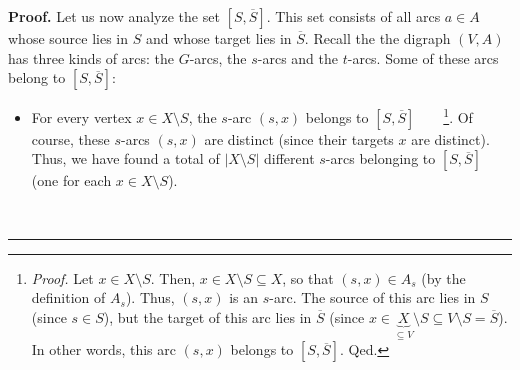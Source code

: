 \documentclass[numbers=enddot,12pt,final,onecolumn,notitlepage]{scrartcl}%
\theoremstyle{definition}
\newenvironment{proof}[1][Proof]{\noindent\textbf{#1.} }{\ \rule{0.5em}{0.5em}}
\begin{document}
\begin{proof}
Let us now analyze the set $\left[  S,\overline{S}\right]  $. This set
consists of all arcs $a\in A$ whose source lies in $S$ and whose target lies
in $\overline{S}$. Recall the the digraph $\left(  V,A\right)  $ has three
kinds of arcs: the $G$-arcs, the $s$-arcs and the $t$-arcs. Some of these arcs
belong to $\left[  S,\overline{S}\right]  $:

\begin{itemize}
\item For every vertex $x\in X\setminus S$, the $s$-arc $\left(  s,x\right)  $
belongs to $\left[  S,\overline{S}\right]  $\ \ \ \ \footnote{\textit{Proof.}
Let $x\in X\setminus S$. Then, $x\in X\setminus S\subseteq X$, so that
$\left(  s,x\right)  \in A_{s}$ (by the definition of $A_{s}$). Thus, $\left(
s,x\right)  $ is an $s$-arc. The source of this arc lies in $S$ (since $s\in
S$), but the target of this arc lies in $\overline{S}$ (since $x\in
\underbrace{X}_{\subseteq V}\setminus S\subseteq V\setminus S=\overline{S}$).
In other words, this arc $\left(  s,x\right)  $ belongs to $\left[
S,\overline{S}\right]  $. Qed.}. Of course, these $s$-arcs $\left(
s,x\right)  $ are distinct (since their targets $x$ are distinct). Thus, we
have found a total of $\left\vert X\setminus S\right\vert $ different $s$-arcs
belonging to $\left[  S,\overline{S}\right]  $ (one for each $x\in X\setminus
S$).


\end{itemize}
\end{proof}
\end{document}
